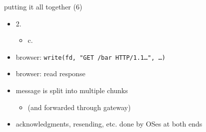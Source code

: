 \begin{frame}{putting it all together (6)}
    \begin{itemize}
    \item 2. 
        \begin{itemize}
        \item c. 
        \end{itemize}
    \vspace{.5cm}
    \item<2-> browser: \texttt{write(fd, "GET /bar HTTP/1.1\ldots", \ldots)}
    \item<2-> browser: read response
    \vspace{.5cm}
    \item<2-> message is split into multiple chunks
        \begin{itemize}
        \item<2-> (and forwarded through gateway)
        \end{itemize}
    \item<2-> acknowledgments, resending, etc. done by OSes at both ends
    \end{itemize}
\end{frame}

